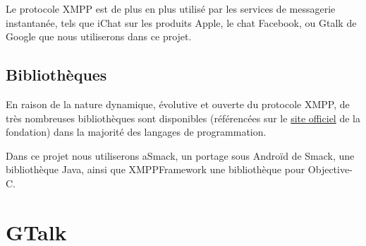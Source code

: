 Le protocole XMPP est de plus en plus utilisé par les services de messagerie instantanée, tels que iChat sur les produits Apple, le chat Facebook, ou Gtalk de Google que nous utiliserons dans ce projet.
\\




\subsection{Bibliothèques}

En raison de la nature dynamique, évolutive et ouverte du protocole XMPP, de très nombreuses bibliothèques sont disponibles (référencées sur le \href{http://xmpp.org/xmpp-software/libraries/}{site officiel} de la fondation) dans la majorité des langages de programmation.

Dans ce projet nous utiliserons aSmack, un portage sous Androïd de Smack, une bibliothèque Java, ainsi que XMPPFramework une bibliothèque pour Objective-C.
\\






\section{GTalk}


